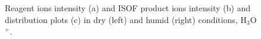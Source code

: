 \begin{figure}

\caption{Reagent ions intensity (a) and ISOF product ions intensity (b) and distribution plots (c) in dry (left) and humid (right) conditions, H$_3$O$^+$.}
\label{fig:isof_h3o}
\end{figure}

